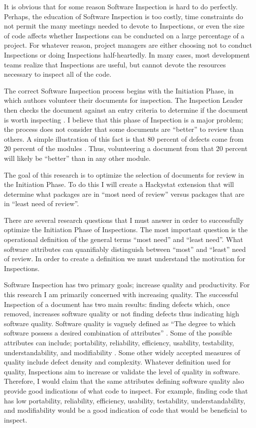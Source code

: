 \documentclass[11pt,twocolumn]{article}
\begin{document}
It is obvious that for some reason Software Inspection is hard to do
perfectly. Perhaps, the education of Software Inspection is too costly,
time constraints do not permit the many meetings needed to devote to
Inspections, or even the size of code affects whether Inspections can be
conducted on a large percentage of a project. For whatever reason,
project managers are either choosing not to conduct Inspections or doing
Inspections half-heartedly. In many cases, most development teams realize
that Inspections are useful, but cannot devote the resources necessary to
inspect all of the code.

The correct Software Inspection process begins with the Initiation Phase,
in which authors volunteer their documents for inspection.  The Inspection
Leader then checks the document against an entry criteria to determine if
the document is worth inspecting \cite{Gilb93}. I believe that this phase
of Inspection is a major problem; the process does not consider that some
documents are ``better'' to review than others. A simple illustration of
this fact is that 80 percent of defects come from 20 percent of the modules
\cite{Boehm01}. Thus, volunteering a document from that 20 percent will
likely be ``better'' than in any other module.

The goal of this research is to optimize the selection of documents for
review in the Initiation Phase. To do this I will create a Hackystat
extension that will determine what packages are in ``most need of review''
versus packages that are in ``least need of review''.

There are several research questions that I must answer in order to
successfully optimize the Initiation Phase of Inspections. The most
important question is the operational definition of the general terms
``most need'' and ``least need''. What software attributes can quanifiably
distinguish between ``most'' and ``least'' need of review. In order to
create a definition we must understand the motivation for Inspections.

Software Inspection has two primary goals; increase quality and
productivity. For this research I am primarily concerned with increasing
quality. The successful Inspection of a document has two main results:
finding defects which, once removed, increases software quality or not
finding defects thus indicating high software quality. Software quality is
vaguely defined as ``The degree to which software possess a desired
combination of attributes'' \cite{IEEEGlossary83}. Some of the possible
attributes can include; portability, reliability, efficiency, usability,
testability, understandability, and modifiability \cite{Glass03}. Some
other widely accepted measures of quality include defect density and
complexity.  Whatever definition used for quality, Inspections aim to
increase or validate the level of quality in software. Therefore, I would
claim that the same attributes defining software quality also provide good
indications of what code to inspect. For example, finding code that has low
portability, reliability, efficiency, usability, testability,
understandability, and modifiability would be a good indication of code
that would be beneficial to inspect.
\end{document}
